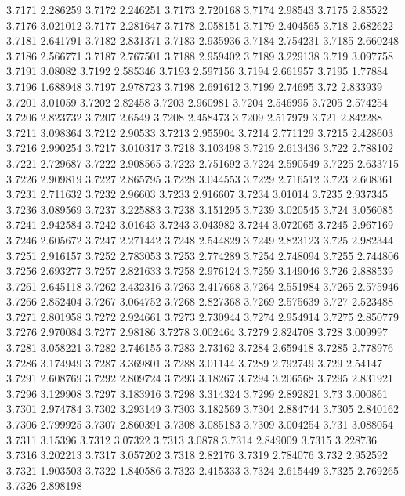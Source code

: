 3.7171  2.286259
3.7172  2.246251
3.7173  2.720168
3.7174  2.98543
3.7175  2.85522
3.7176  3.021012
3.7177  2.281647
3.7178  2.058151
3.7179  2.404565
3.718  2.682622
3.7181  2.641791
3.7182  2.831371
3.7183  2.935936
3.7184  2.754231
3.7185  2.660248
3.7186  2.566771
3.7187  2.767501
3.7188  2.959402
3.7189  3.229138
3.719  3.097758
3.7191  3.08082
3.7192  2.585346
3.7193  2.597156
3.7194  2.661957
3.7195  1.77884
3.7196  1.688948
3.7197  2.978723
3.7198  2.691612
3.7199  2.74695
3.72  2.833939
3.7201  3.01059
3.7202  2.82458
3.7203  2.960981
3.7204  2.546995
3.7205  2.574254
3.7206  2.823732
3.7207  2.6549
3.7208  2.458473
3.7209  2.517979
3.721  2.842288
3.7211  3.098364
3.7212  2.90533
3.7213  2.955904
3.7214  2.771129
3.7215  2.428603
3.7216  2.990254
3.7217  3.010317
3.7218  3.103498
3.7219  2.613436
3.722  2.788102
3.7221  2.729687
3.7222  2.908565
3.7223  2.751692
3.7224  2.590549
3.7225  2.633715
3.7226  2.909819
3.7227  2.865795
3.7228  3.044553
3.7229  2.716512
3.723  2.608361
3.7231  2.711632
3.7232  2.96603
3.7233  2.916607
3.7234  3.01014
3.7235  2.937345
3.7236  3.089569
3.7237  3.225883
3.7238  3.151295
3.7239  3.020545
3.724  3.056085
3.7241  2.942584
3.7242  3.01643
3.7243  3.043982
3.7244  3.072065
3.7245  2.967169
3.7246  2.605672
3.7247  2.271442
3.7248  2.544829
3.7249  2.823123
3.725  2.982344
3.7251  2.916157
3.7252  2.783053
3.7253  2.774289
3.7254  2.748094
3.7255  2.744806
3.7256  2.693277
3.7257  2.821633
3.7258  2.976124
3.7259  3.149046
3.726  2.888539
3.7261  2.645118
3.7262  2.432316
3.7263  2.417668
3.7264  2.551984
3.7265  2.575946
3.7266  2.852404
3.7267  3.064752
3.7268  2.827368
3.7269  2.575639
3.727  2.523488
3.7271  2.801958
3.7272  2.924661
3.7273  2.730944
3.7274  2.954914
3.7275  2.850779
3.7276  2.970084
3.7277  2.98186
3.7278  3.002464
3.7279  2.824708
3.728  3.009997
3.7281  3.058221
3.7282  2.746155
3.7283  2.73162
3.7284  2.659418
3.7285  2.778976
3.7286  3.174949
3.7287  3.369801
3.7288  3.01144
3.7289  2.792749
3.729  2.54147
3.7291  2.608769
3.7292  2.809724
3.7293  3.18267
3.7294  3.206568
3.7295  2.831921
3.7296  3.129908
3.7297  3.183916
3.7298  3.314324
3.7299  2.892821
3.73  3.000861
3.7301  2.974784
3.7302  3.293149
3.7303  3.182569
3.7304  2.884744
3.7305  2.840162
3.7306  2.799925
3.7307  2.860391
3.7308  3.085183
3.7309  3.004254
3.731  3.088054
3.7311  3.15396
3.7312  3.07322
3.7313  3.0878
3.7314  2.849009
3.7315  3.228736
3.7316  3.202213
3.7317  3.057202
3.7318  2.82176
3.7319  2.784076
3.732  2.952592
3.7321  1.903503
3.7322  1.840586
3.7323  2.415333
3.7324  2.615449
3.7325  2.769265
3.7326  2.898198
